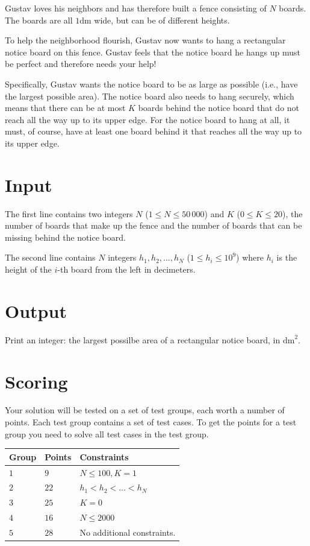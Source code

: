 Gustav loves his neighbors and has therefore built a fence consisting of $N$ boards. The boards are all $1 \text{dm}$ wide,
but can be of different heights.

To help the neighborhood flourish, Gustav now wants to hang a rectangular notice board on this fence. Gustav feels
that the notice board he hangs up must be perfect and therefore needs your help!

Specifically, Gustav wants the notice board to be as large as possible (i.e., have the largest possible area). The
notice board also needs to hang securely, which means that there can be at most $K$ boards behind the notice board
that do not reach all the way up to its upper edge. For the notice board to hang at all, it must, of course, have
at least one board behind it that reaches all the way up to its upper edge.

\section*{Input}
The first line contains two integers $N$ ($1 \leq N \leq 50\,000$) and $K$ ($0 \leq K \leq 20$), the number
of boards that make up the fence and the number of boards that can be missing behind the notice board.

The second line contains $N$ integers $h_{1}, h_{2}, \dots, h_{N}$ ($1 \leq h_{i} \leq 10^{9}$) where $h_i$
is the height of the $i$-th board from the left in decimeters.

\section*{Output}
Print an integer: the largest possilbe area of a rectangular notice board, in $\text{dm}^{2}$.

\section*{Scoring}
Your solution will be tested on a set of test groups, each worth a number of points. Each test group contains
a set of test cases. To get the points for a test group you need to solve all test cases in the test group.

\noindent
\begin{tabular}{| l | l | p{12cm} |}
  \hline
  \textbf{Group} & \textbf{Points} & \textbf{Constraints} \\ \hline
  $1$    & $9$        & $N \le 100, K = 1$\\ \hline 
  $2$    & $22$       & $h_{1} < h_{2} < \ldots < h_{N}$ \\ \hline
  $3$    & $25$       & $K = 0$ \\ \hline
  $4$    & $16$       & $N \le 2000 $ \\ \hline
  $5$    & $28$       & No additional constraints. \\ \hline
\end{tabular}

